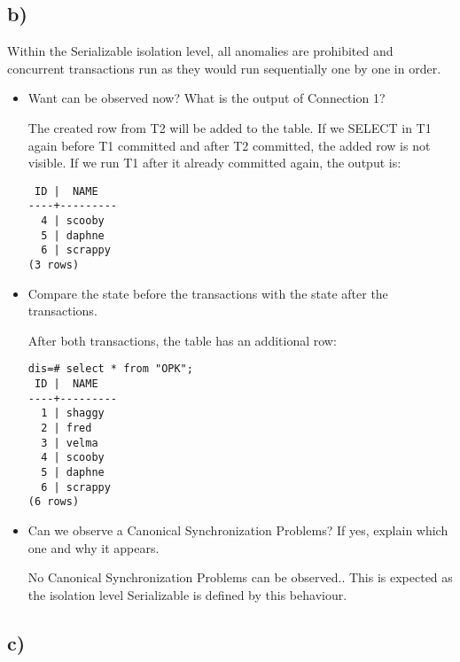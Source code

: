 \documentclass[ngerman]{dis-template-add}
\begin{document}
\subsection*{b)}

Within the Serializable isolation level, all anomalies are prohibited and concurrent transactions run as they would run sequentially one by one in order.


\begin{itemize}
\item Want can be observed now? What is the output of Connection 1?

The created row from T2 will be added to the table.
If we SELECT in T1 again before T1 committed and after T2 committed, the added row is not visible.
If we run T1 after it already committed again, the output is:

\begin{verbatim}
 ID |  NAME   
----+---------
  4 | scooby
  5 | daphne
  6 | scrappy
(3 rows)
\end{verbatim}

\item Compare the state before the transactions with the state after the transactions.

After both transactions, the table has an additional row:

\begin{verbatim}
dis=# select * from "OPK";
 ID |  NAME   
----+---------
  1 | shaggy
  2 | fred
  3 | velma
  4 | scooby
  5 | daphne
  6 | scrappy
(6 rows)
\end{verbatim}

\item Can we observe a Canonical Synchronization Problems? If yes, explain which one and why it appears.

No Canonical Synchronization Problems can be observed.. This is expected as the isolation level Serializable is defined by this behaviour.

\end{itemize}

\subsection*{c)}
\end{document}
